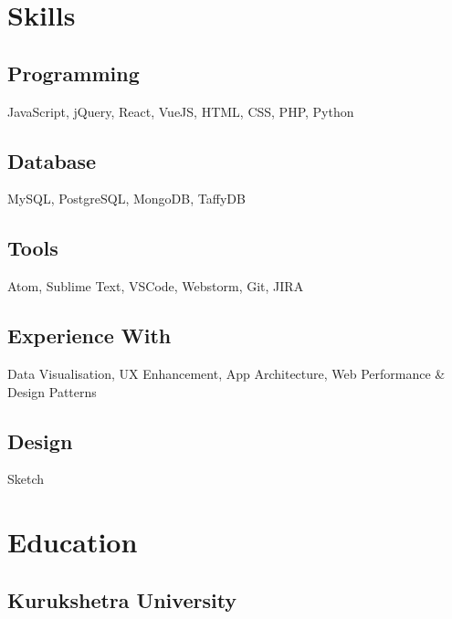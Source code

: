 \documentclass[]{gagan-resume}
\begin{document}
\begin{minipage}[t]{0.33\textwidth}




\section{Skills}
\subsection{Programming}
JavaScript, jQuery, React, VueJS, HTML, CSS, PHP, Python
\subsection{Database}
MySQL, PostgreSQL, MongoDB, TaffyDB
\subsection{Tools}
Atom, Sublime Text, VSCode, Webstorm, Git, JIRA
\subsection{Experience With}
Data Visualisation, UX Enhancement, App Architecture, Web Performance \& Design Patterns
\subsection{Design}
Sketch
\sectionsep




\section{Education} 

\subsection{Kurukshetra University}
\sectionsep





\end{minipage}
\end{document}
